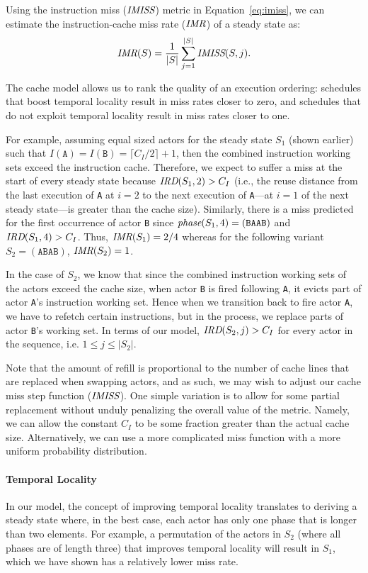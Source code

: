 Using the instruction miss ($\mbox{\it IMISS}$) metric in
Equation~\ref{eq:imiss}, we can estimate the instruction-cache miss
rate ($\mbox{\it IMR}$) of a steady state as: 
\begin{equation}
\label{eq:imr}
  \mbox{\it IMR}(S) = \frac{1}{|S|}\sum_{j=1}^{|S|} \mbox{\it IMISS}(S,j).
\end{equation}

The cache model allows us to rank the quality of an
execution ordering: schedules that boost temporal locality
result in miss rates closer to zero, and schedules that do not
exploit temporal locality result in miss rates closer to one.

For example, assuming equal sized actors for the steady
state $S_1$ (shown earlier) such that
$I(\texttt{A})=I(\texttt{B})=\lceil{C_I/2}\rceil+1$, then the
combined instruction working 
sets exceed the instruction cache. Therefore, 
we expect to suffer a miss at the start of every
steady state because $\mbox{\it IRD}(S_1, 2)>C_I$ (i.e., the reuse distance
from the last execution of \texttt{A} at $i=2$ to the next execution
of \texttt{A}---at $i=1$ of the next steady state---is greater than the cache
size). Similarly, there is a 
miss predicted for the first occurrence of actor \texttt{B} since
$\mbox{\it phase}(S_1,4)=(\texttt{BAAB})$ and 
$\mbox{\it IRD}(S_1, 4)>C_I$. Thus, $\mbox{\it IMR}(S_1)=2/4$ whereas for the
following variant $S_2=(\texttt{ABAB})$, $\mbox{\it IMR}(S_2)=1$.

In the case of $S_2$, we know that since the combined
instruction working sets of the actors exceed the cache size, when
actor \texttt{B} is fired following \texttt{A}, it evicts part of
actor \texttt{A}'s instruction working set. Hence when we transition
back to fire actor \texttt{A}, we have to refetch certain
instructions, but in the process, we replace parts of actor
\texttt{B}'s working set. In terms of our model, $\mbox{\it IRD}(S_2,j)>C_I$
for every actor in the sequence, i.e. $1\le j\le|S_2|$.

Note that the
amount of refill is proportional to the number of cache lines that are
replaced when swapping actors, and as such, we may wish to adjust
our cache miss step function ($\mbox{\it IMISS}$). One simple variation is to allow for
some partial replacement without unduly penalizing the overall value
of the metric. Namely, we can allow the constant $C_I$ to be some
fraction greater than the actual cache size. Alternatively, we can use
a more complicated miss function with a more uniform probability
distribution.

\paragraph*{Temporal Locality} In our model, the concept of improving
temporal locality translates to deriving a steady state where, in the
best case, each actor has only one phase that is longer than two
elements. For example, a permutation of the actors in $S_2$ (where all
phases are of length three) that improves temporal locality
will result in $S_1$, which we have shown has a relatively lower miss rate.



